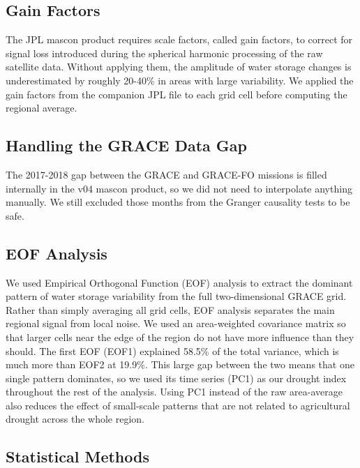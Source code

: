 \documentclass[6pt, twocolumn]{article}
\begin{document}
\subsection{Gain Factors}

The JPL mascon product \cite{watkins2015improved} requires scale factors, called gain factors,
to correct for signal loss introduced during the spherical harmonic
processing of the raw satellite data. Without applying them, the
amplitude of water storage changes is underestimated by roughly
20-40\% in areas with large variability. We applied the gain factors
from the companion JPL file to each grid cell before computing the
regional average.

\subsection{Handling the GRACE Data Gap}

The 2017-2018 gap between the GRACE and GRACE-FO missions is filled
internally in the v04 mascon product, so we did not need to
interpolate anything manually. We still excluded those months from
the Granger causality tests to be safe.

\subsection{EOF Analysis}

We used Empirical Orthogonal Function (EOF) analysis to extract
the dominant pattern of water storage variability from the full
two-dimensional GRACE grid. Rather than simply averaging all grid
cells, EOF analysis separates the main regional signal from local
noise. We used an area-weighted covariance matrix so that larger
cells near the edge of the region do not have more influence than
they should. The first EOF (EOF1) explained 58.5\% of the
total variance, which is much more than EOF2 at 19.9\%. This large
gap between the two means that one single pattern dominates, so we
used its time series (PC1) as our drought index throughout the rest
of the analysis. Using PC1 instead of the raw area-average also
reduces the effect of small-scale patterns that are not related to
agricultural drought across the whole region.

\subsection{Statistical Methods}
\end{document}
